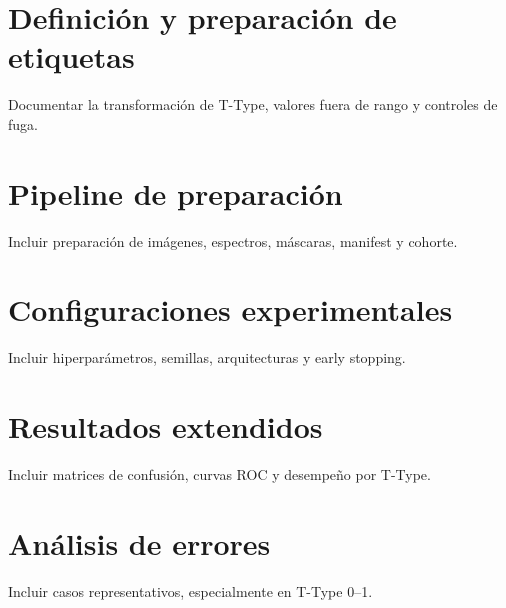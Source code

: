 \documentclass[letterpaper,11pt]{article}
\begin{document}
\appendix
\section{Definición y preparación de etiquetas}
Documentar la transformación de T-Type, valores fuera de rango y controles de fuga.
\section{Pipeline de preparación}
Incluir preparación de imágenes, espectros, máscaras, manifest y cohorte.
\section{Configuraciones experimentales}
Incluir hiperparámetros, semillas, arquitecturas y early stopping.
\section{Resultados extendidos}
Incluir matrices de confusión, curvas ROC y desempeño por T-Type.
\section{Análisis de errores}
Incluir casos representativos, especialmente en T-Type 0--1.
\end{document}

